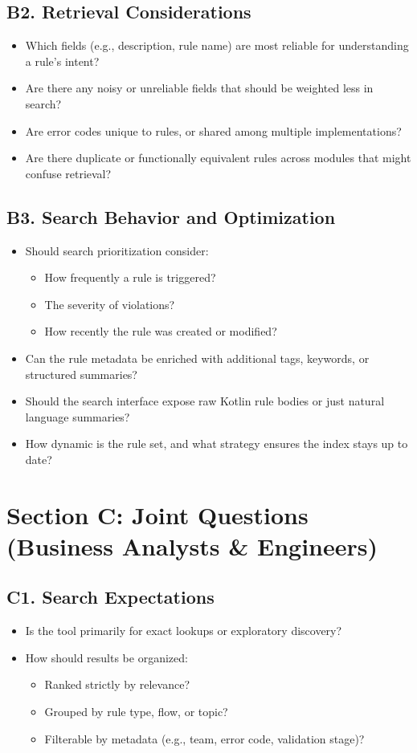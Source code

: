 \subsection{B2. Retrieval Considerations}
\begin{itemize}
  \item Which fields (e.g., description, rule name) are most reliable for understanding a rule’s intent?
  \item Are there any noisy or unreliable fields that should be weighted less in search?
  \item Are error codes unique to rules, or shared among multiple implementations?
  \item Are there duplicate or functionally equivalent rules across modules that might confuse retrieval?
\end{itemize}

\subsection{B3. Search Behavior and Optimization}
\begin{itemize}
  \item Should search prioritization consider:
  \begin{itemize}
    \item How frequently a rule is triggered?
    \item The severity of violations?
    \item How recently the rule was created or modified?
  \end{itemize}
  \item Can the rule metadata be enriched with additional tags, keywords, or structured summaries?
  \item Should the search interface expose raw Kotlin rule bodies or just natural language summaries?
  \item How dynamic is the rule set, and what strategy ensures the index stays up to date?
\end{itemize}

\section{Section C: Joint Questions (Business Analysts \& Engineers)}
\subsection{C1. Search Expectations}
\begin{itemize}
  \item Is the tool primarily for exact lookups or exploratory discovery?
  \item How should results be organized:
  \begin{itemize}
    \item Ranked strictly by relevance?
    \item Grouped by rule type, flow, or topic?
    \item Filterable by metadata (e.g., team, error code, validation stage)?
  \end{itemize}
\end{itemize}

